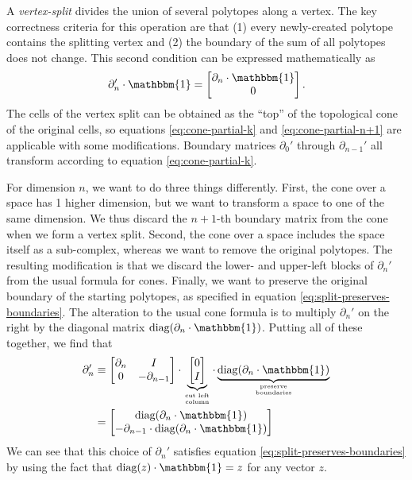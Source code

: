 \documentclass[twocolumn]{article}
\begin{document}
A \emph{vertex-split} divides the union of several polytopes along a vertex.
The key correctness criteria for this operation are that (1) every newly-created polytope contains the splitting vertex and (2) the boundary of the sum of all polytopes does not change.
This second condition can be expressed mathematically as
\begin{equation}
    \partial_n'\cdot\mathbbm{1} = \left[\begin{matrix}\partial_n\cdot\mathbbm{1} \\ 0\end{matrix}\right].
    \label{eq:split-preserves-boundaries}
\end{equation}
The cells of the vertex split can be obtained as the ``top'' of the topological cone of the original cells, so equations \eqref{eq:cone-partial-k} and \eqref{eq:cone-partial-n+1} are applicable with some modifications.
Boundary matrices $\partial_0'$ through $\partial_{n - 1}'$ all transform according to equation \eqref{eq:cone-partial-k}.

For dimension $n$, we want to do three things differently.
First, the cone over a space has 1 higher dimension, but we want to transform a space to one of the same dimension.
We thus discard the $n + 1$-th boundary matrix from the cone when we form a vertex split.
Second, the cone over a space includes the space itself as a sub-complex, whereas we want to remove the original polytopes.
The resulting modification is that we discard the lower- and upper-left blocks of $\partial_n'$ from the usual formula for cones.
Finally, we want to preserve the original boundary of the starting polytopes, as specified in equation \eqref{eq:split-preserves-boundaries}.
The alteration to the usual cone formula is to multiply $\partial_n'$ on the right by the diagonal matrix $\text{diag}(\partial_n\cdot\mathbbm{1})$.
Putting all of these together, we find that
\begin{align}
    \partial_n' & \equiv \left[\begin{matrix}\partial_n & I \\ 0 & -\partial_{n - 1}\end{matrix}\right]\cdot \underbrace{\left[\begin{matrix}0 \\ I\end{matrix}\right]}_{\text{cut left}\atop\text{column}}\cdot \underbrace{\text{diag}(\partial_n\cdot\mathbbm{1})}_{\text{preserve}\atop\text{boundaries}} \nonumber\\
        & = \left[\begin{matrix}\text{diag}(\partial_n\cdot\mathbbm{1}) \\ -\partial_{n - 1}\cdot\text{diag}(\partial_n\cdot\mathbbm{1})\end{matrix}\right]
    \label{eq:vertex-split-n}
\end{align}
We can see that this choice of $\partial_n'$ satisfies equation \eqref{eq:split-preserves-boundaries} by using the fact that $\text{diag}(z)\cdot\mathbbm{1} = z$ for any vector $z$.
\end{document}
